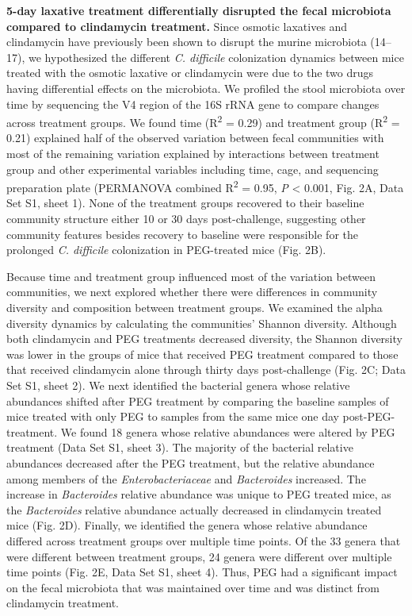 \documentclass[
  11pt,
]{article}
\begin{document}
\textbf{5-day laxative treatment differentially disrupted the fecal
microbiota compared to clindamycin treatment.} Since osmotic laxatives
and clindamycin have previously been shown to disrupt the murine
microbiota (14--17), we hypothesized the different \emph{C. difficile}
colonization dynamics between mice treated with the osmotic laxative or
clindamycin were due to the two drugs having differential effects on the
microbiota. We profiled the stool microbiota over time by sequencing the
V4 region of the 16S rRNA gene to compare changes across treatment
groups. We found time (R\textsuperscript{2} = 0.29) and treatment group
(R\textsuperscript{2} = 0.21) explained half of the observed variation
between fecal communities with most of the remaining variation explained
by interactions between treatment group and other experimental variables
including time, cage, and sequencing preparation plate (PERMANOVA
combined R\textsuperscript{2} = 0.95, \emph{P} \textless{} 0.001, Fig.
2A, Data Set S1, sheet 1). None of the treatment groups recovered to
their baseline community structure either 10 or 30 days post-challenge,
suggesting other community features besides recovery to baseline were
responsible for the prolonged \emph{C. difficile} colonization in
PEG-treated mice (Fig. 2B).

Because time and treatment group influenced most of the variation
between communities, we next explored whether there were differences in
community diversity and composition between treatment groups. We
examined the alpha diversity dynamics by calculating the communities'
Shannon diversity. Although both clindamycin and PEG treatments
decreased diversity, the Shannon diversity was lower in the groups of
mice that received PEG treatment compared to those that received
clindamycin alone through thirty days post-challenge (Fig. 2C; Data Set
S1, sheet 2). We next identified the bacterial genera whose relative
abundances shifted after PEG treatment by comparing the baseline samples
of mice treated with only PEG to samples from the same mice one day
post-PEG-treatment. We found 18 genera whose relative abundances were
altered by PEG treatment (Data Set S1, sheet 3). The majority of the
bacterial relative abundances decreased after the PEG treatment, but the
relative abundance among members of the \emph{Enterobacteriaceae} and
\emph{Bacteroides} increased. The increase in \emph{Bacteroides}
relative abundance was unique to PEG treated mice, as the
\emph{Bacteroides} relative abundance actually decreased in clindamycin
treated mice (Fig. 2D). Finally, we identified the genera whose relative
abundance differed across treatment groups over multiple time points. Of
the 33 genera that were different between treatment groups, 24 genera
were different over multiple time points (Fig. 2E, Data Set S1, sheet
4). Thus, PEG had a significant impact on the fecal microbiota that was
maintained over time and was distinct from clindamycin treatment.
\end{document}
